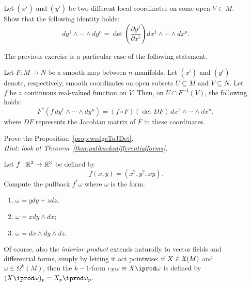 \begin{exercise}
	Let $(x^i)$ and $(y^i)$ be two different local coordinates on some open $V\subset M$.
	Show that the following identity holds:
	\begin{equation}
		dy^1\wedge\cdots\wedge dy^n = \det\left(\frac{\partial y^j}{\partial x^i}\right) dx^1\wedge\cdots\wedge dx^n.
	\end{equation}
\end{exercise}

The previous exercise is a particular case of the following statement.

\begin{proposition}\label{prop:wedgeToJDet}
	Let $F:M\to N$ be a smooth map between $n$-manifolds.
	Let $(x^i)$ and $(y^i)$ denote, respectively, smooth coordinates on open subsets $U\subseteq M$ and $V\subseteq N$.
	Let $f$ be a continuous real-valued function on $V$.
	Then, on $U\cap F^{-1}(V)$, the following holds:
	\begin{equation}
		F^*(f\, dy^1\wedge\cdots\wedge dy^n)
		= (f\circ F) (\det DF)\, dx^1\wedge\cdots\wedge dx^n,
	\end{equation}
	where $DF$ represents the Jacobian matrix of $F$ in these coordinates.
\end{proposition}

\begin{exercise}
	Prove the Proposition~\ref{prop:wedgeToJDet}.\\
	\textit{\small Hint: look at Theorem~\ref{thm:pullbacksdifferentialforms}.}
\end{exercise}

\begin{exercise}
	Let $f: \mathbb{R}^2 \to \mathbb{R}^3$ be defined by
	\begin{equation}
		f(x, y) = (x^2, y^2, xy).
	\end{equation}
	Compute the pullback $f^*\omega$ where $\omega$ is the form:
	\begin{enumerate}
		\item $\omega = y dy + z dz$;
		\item $\omega = x dy \wedge dx$;
		\item $\omega = dx \wedge dy\wedge dz$.
	\end{enumerate}
\end{exercise}

Of course, also the \emph{interior product} extends naturally to vector fields and differential forms, simply by letting it act pointwise: if $X\in\mathfrak{X}(M)$ and $\omega\in\Omega^k(M)$, then the $k-1$-form $\iota_X\omega\equiv X\iprod\omega$ is defined by $(X\iprod\omega)_p = X_p \iprod \omega_p$.

